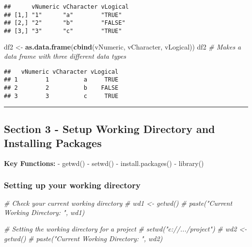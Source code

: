 \documentclass[
]{article}
\newenvironment{Shaded}{\begin{snugshade}}{\end{snugshade}}
\newcommand{\CommentTok}[1]{\textcolor[rgb]{0.56,0.35,0.01}{\textit{#1}}}
\newcommand{\FunctionTok}[1]{\textcolor[rgb]{0.13,0.29,0.53}{\textbf{#1}}}
\newcommand{\NormalTok}[1]{#1}
\newcommand{\OtherTok}[1]{\textcolor[rgb]{0.56,0.35,0.01}{#1}}
\begin{document}
\begin{verbatim}
##      vNumeric vCharacter vLogical
## [1,] "1"      "a"        "TRUE"  
## [2,] "2"      "b"        "FALSE" 
## [3,] "3"      "c"        "TRUE"
\end{verbatim}

\begin{Shaded}
\begin{Highlighting}[]
\NormalTok{df2 }\OtherTok{\textless{}{-}} \FunctionTok{as.data.frame}\NormalTok{(}\FunctionTok{cbind}\NormalTok{(vNumeric, vCharacter, vLogical))}
\NormalTok{df2  }\CommentTok{\# Makes a data frame with three different data types}
\end{Highlighting}
\end{Shaded}

\begin{verbatim}
##   vNumeric vCharacter vLogical
## 1        1          a     TRUE
## 2        2          b    FALSE
## 3        3          c     TRUE
\end{verbatim}

\begin{center}\rule{0.5\linewidth}{0.5pt}\end{center}

\subsection{Section 3 - Setup Working Directory and Installing
Packages}\label{section-3---setup-working-directory-and-installing-packages}

\textbf{Key Functions:} - getwd() - setwd() - install.packages() -
library()

\subsubsection{Setting up your working
directory}\label{setting-up-your-working-directory}

\begin{Shaded}
\begin{Highlighting}[]
\CommentTok{\# Check your current working directory}
\CommentTok{\# wd1 \textless{}{-} getwd()}
\CommentTok{\# paste("Current Working Directory: ", wd1)}

\CommentTok{\# Setting the working directory for a project}
\CommentTok{\# setwd("c://.../project")}
\CommentTok{\# wd2 \textless{}{-} getwd()}
\CommentTok{\# paste("Current Working Directory: ", wd2)}
\end{Highlighting}
\end{Shaded}
\end{document}
